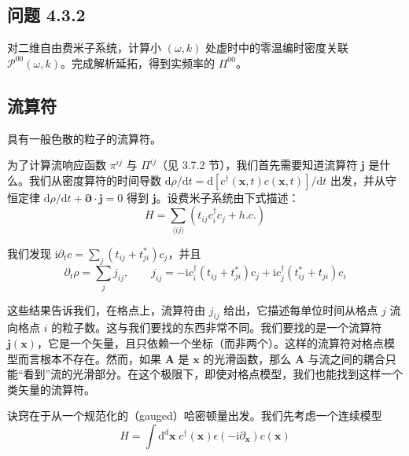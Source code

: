 \subsection*{问题 4.3.2}

对二维自由费米子系统，计算小 $(\omega,k)$ 处虚时中的零温编时密度关联 $\mathcal{P}^{00}(\omega,k)$。完成解析延拓，得到实频率的 $\Pi^{00}$。

\subsection{流算符}

\begin{keypoints}
\item 具有一般色散的粒子的流算符。
\end{keypoints}

为了计算流响应函数 $\pi^{ij}$ 与 $\Pi^{ij}$（见 3.7.2 节），我们首先需要知道流算符 $\pmb{j}$ 是什么。我们从密度算符的时间导数 $\mathrm{d}\rho/\mathrm{d}t=\mathrm{d}[c^{\dagger}(\pmb{x},t)c(\pmb{x},t)]/\mathrm{d}t$ 出发，并从守恒定律 $\mathrm{d}\rho/\mathrm{d}t+\pmb{\partial}\cdot\pmb{j}=0$ 得到 $\pmb{j}$。设费米子系统由下式描述：
\begin{equation*}
H = \sum_{\langle ij\rangle}\left(t_{ij}c^{\dagger}_i c_j + h.c.\right)
\end{equation*}

我们发现 $\mathrm{i}\partial_t c=\sum_j(t_{ij}+t^{*}_{ji})c_j$，并且
\begin{equation*}
\partial_t\rho = \sum_j j_{ij}, \qquad j_{ij} = -\mathrm{i}c^{\dagger}_i(t_{ij}+t^{*}_{ji})c_j + \mathrm{i}c^{\dagger}_j(t^{*}_{ij}+t_{ji})c_i
\end{equation*}

这些结果告诉我们，在格点上，流算符由 $j_{ij}$ 给出，它描述每单位时间从格点 $j$ 流向格点 $i$ 的粒子数。这与我们要找的东西非常不同。我们要找的是一个流算符 $\pmb{j}(\pmb{x})$，它是一个矢量，且只依赖一个坐标（而非两个）。这样的流算符对格点模型而言根本不存在。然而，如果 $\pmb{A}$ 是 $\pmb{x}$ 的光滑函数，那么 $\pmb{A}$ 与流之间的耦合只能“看到”流的光滑部分。在这个极限下，即使对格点模型，我们也能找到这样一个类矢量的流算符。

诀窍在于从一个规范化的（gauged）哈密顿量出发。我们先考虑一个连续模型
\begin{equation*}
H = \int \mathrm{d}^d\pmb{x}\; c^{\dagger}(\pmb{x})\epsilon(-\mathrm{i}\partial_{\pmb{x}})c(\pmb{x})
\end{equation*}

